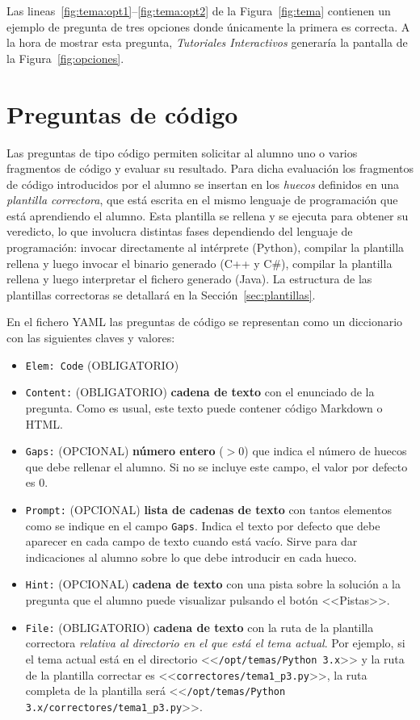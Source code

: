 \documentclass[]{article}
\newcommand{\code}[1]{{\lstinline[basicstyle=\ttfamily,mathescape]!#1!}}
\newcommand{\toolname}{\emph{Tutoriales Interactivos}}
\begin{document}
Las lineas~\ref{fig:tema:opt1}--\ref{fig:tema:opt2} de la Figura~\ref{fig:tema} contienen un ejemplo de pregunta de tres opciones donde únicamente la primera es correcta. A la hora de mostrar esta pregunta, \toolname{} generaría la pantalla de la Figura~\ref{fig:opciones}.

\section{Preguntas de código}
Las preguntas de tipo código permiten solicitar al alumno uno o varios fragmentos de código y evaluar su resultado. Para dicha evaluación los fragmentos de código introducidos por el alumno se insertan en los \emph{huecos} definidos en una \emph{plantilla correctora}, que está escrita en el mismo lenguaje de programación que está aprendiendo el alumno. Esta plantilla se rellena y se ejecuta para obtener su veredicto, lo que involucra distintas fases dependiendo del lenguaje de programación: invocar directamente al intérprete (Python), compilar la plantilla rellena y luego invocar el binario generado (C++ y C\#), compilar la plantilla rellena y luego interpretar el fichero generado (Java). La estructura de las plantillas correctoras se detallará en la Sección~\ref{sec:plantillas}.

En el fichero YAML las preguntas de código se representan como un diccionario con las siguientes claves y valores:
\begin{itemize}
	\item \code{Elem: Code} {\sf (OBLIGATORIO)}
	\item \code{Content:} {\sf (OBLIGATORIO)} \textbf{cadena de texto} con el enunciado de la pregunta. Como es usual, este texto puede contener código Markdown o HTML. 
	\item \code{Gaps:} {\sf (OPCIONAL)} \textbf{número entero} ($> 0$) que indica el número de huecos que debe rellenar el alumno. Si no se incluye este campo, el valor por defecto es $0$.	
	\item \code{Prompt:} {\sf (OPCIONAL)} \textbf{lista de cadenas de texto} con tantos elementos como se indique en el campo \code{Gaps}. Indica el texto por defecto que debe aparecer en cada campo de texto cuando está vacío. Sirve para dar indicaciones al alumno sobre lo que debe introducir en cada hueco.
	\item \code{Hint:}  {\sf (OPCIONAL)} \textbf{cadena de texto} con una pista sobre la solución a la pregunta que el alumno puede visualizar pulsando el botón <<Pistas>>.
	\item \code{File:} {\sf (OBLIGATORIO)} \textbf{cadena de texto} con la ruta de la plantilla correctora \emph{relativa al directorio en el que está el tema actual}. Por ejemplo, si el tema actual está en el directorio <<\code{/opt/temas/Python 3.x}>> y la ruta de la plantilla correctar es <<\code{correctores/tema1_p3.py}>>, la ruta completa de la plantilla será <<\code{/opt/temas/Python 3.x/correctores/tema1_p3.py}>>.
\end{itemize}
\end{document}
